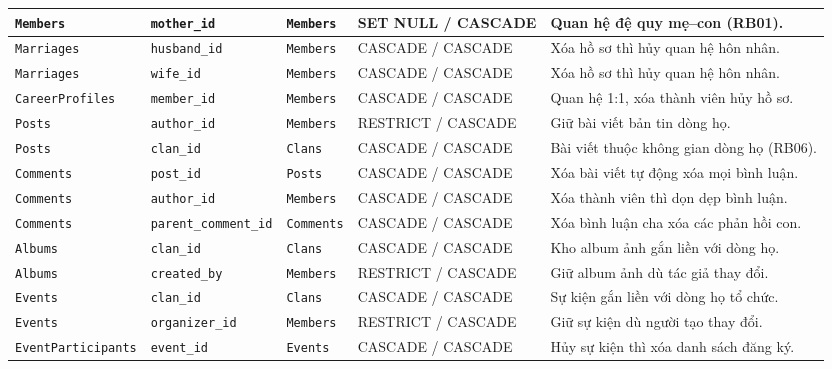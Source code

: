\begin{table}[H]
\begin{tabularx}{\textwidth}{|l|l|l|l|X|}
        \texttt{Members} & \texttt{mother\_id} & \texttt{Members} & SET NULL / CASCADE & Quan hệ đệ quy mẹ--con (RB01). \\
        \hline
        \texttt{Marriages} & \texttt{husband\_id} & \texttt{Members} & CASCADE / CASCADE & Xóa hồ sơ thì hủy quan hệ hôn nhân. \\
        \hline
        \rowcolor{tablerowalt}
        \texttt{Marriages} & \texttt{wife\_id} & \texttt{Members} & CASCADE / CASCADE & Xóa hồ sơ thì hủy quan hệ hôn nhân. \\
        \hline
        \texttt{CareerProfiles} & \texttt{member\_id} & \texttt{Members} & CASCADE / CASCADE & Quan hệ 1:1, xóa thành viên hủy hồ sơ. \\
        \hline
        \rowcolor{tablerowalt}
        \texttt{Posts} & \texttt{author\_id} & \texttt{Members} & RESTRICT / CASCADE & Giữ bài viết bản tin dòng họ. \\
        \hline
        \texttt{Posts} & \texttt{clan\_id} & \texttt{Clans} & CASCADE / CASCADE & Bài viết thuộc không gian dòng họ (RB06). \\
        \hline
        \rowcolor{tablerowalt}
        \texttt{Comments} & \texttt{post\_id} & \texttt{Posts} & CASCADE / CASCADE & Xóa bài viết tự động xóa mọi bình luận. \\
        \hline
        \texttt{Comments} & \texttt{author\_id} & \texttt{Members} & CASCADE / CASCADE & Xóa thành viên thì dọn dẹp bình luận. \\
        \hline
        \rowcolor{tablerowalt}
        \texttt{Comments} & \texttt{parent\_comment\_id} & \texttt{Comments} & CASCADE / CASCADE & Xóa bình luận cha xóa các phản hồi con. \\
        \hline
        \texttt{Albums} & \texttt{clan\_id} & \texttt{Clans} & CASCADE / CASCADE & Kho album ảnh gắn liền với dòng họ. \\
        \hline
        \rowcolor{tablerowalt}
        \texttt{Albums} & \texttt{created\_by} & \texttt{Members} & RESTRICT / CASCADE & Giữ album ảnh dù tác giả thay đổi. \\
        \hline
        \texttt{Events} & \texttt{clan\_id} & \texttt{Clans} & CASCADE / CASCADE & Sự kiện gắn liền với dòng họ tổ chức. \\
        \hline
        \rowcolor{tablerowalt}
        \texttt{Events} & \texttt{organizer\_id} & \texttt{Members} & RESTRICT / CASCADE & Giữ sự kiện dù người tạo thay đổi. \\
        \hline
        \texttt{EventParticipants} & \texttt{event\_id} & \texttt{Events} & CASCADE / CASCADE & Hủy sự kiện thì xóa danh sách đăng ký. \\

\end{tabularx}
\end{table}
